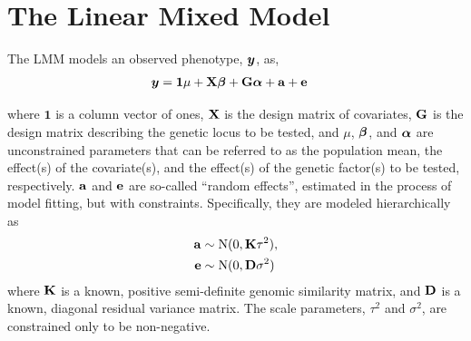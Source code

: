 




\section{The Linear Mixed Model}
The LMM models an observed phenotype, $\bm{y}$, as,
\begin{align}
	\bm{y}	&= \mathbf{1}\mu + \mathbf{X}\boldsymbol{\beta} + \mathbf{G}\boldsymbol{\alpha} + \mathbf{a} + \mathbf{e}  \label{eq:lmm}
\end{align}

where $\mathbf{1}$ is a column vector of ones, $\mathbf{X}$ is the design matrix of covariates, $\mathbf{G}$ is the design matrix describing the genetic locus to be tested, and $\mu$, $\boldsymbol{\beta}$, and $\boldsymbol{\alpha}$ are unconstrained parameters that can be referred to as the population mean, the effect(s) of the covariate(s), and the effect(s) of the genetic factor(s) to be tested, respectively.
$\mathbf{a}$ and $\mathbf{e}$ are so-called ``random effects'', estimated in the process of model fitting, but with constraints.
Specifically, they are modeled hierarchically as
\begin{align}
    \mathbf{a} &\sim \mathrm{N}(0, \mathbf{K} \tau^2) ,   \label{eq:a}\\
    \mathbf{e} &\sim \mathrm{N}(0, \mathbf{D} \sigma^2)   \label{eq:e}
\end{align}
where $\mathbf{K}$ is a known, positive semi-definite genomic similarity matrix, and $\mathbf{D}$ is a known, diagonal residual variance matrix.
The scale parameters, $\tau^2$ and $\sigma^2$, are constrained only to be non-negative.

